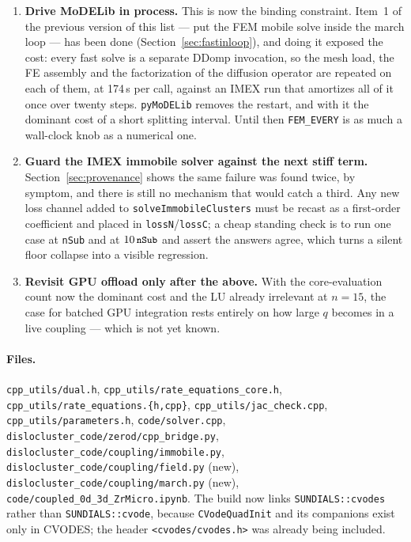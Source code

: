 \documentclass[11pt,a4paper]{article}
\newcommand{\code}[1]{\texttt{\small #1}}
\begin{document}
\begin{enumerate}
\item \textbf{Drive MoDELib in process.} This is now the binding constraint.
      Item~1 of the previous version of this list --- put the FEM mobile solve
      inside the march loop --- has been done (Section~\ref{sec:fastinloop}),
      and doing it exposed the cost: every fast solve is a separate DDomp
      invocation, so the mesh load, the FE assembly and the factorization of the
      diffusion operator are repeated on each of them, at 174\,s per call,
      against an IMEX run that amortizes all of it once over twenty steps.
      \code{pyMoDELib} removes the restart, and with it the dominant cost of a
      short splitting interval. Until then \code{FEM\_EVERY} is as much a
      wall-clock knob as a numerical one.
\item \textbf{Guard the IMEX immobile solver against the next stiff term.}
      Section~\ref{sec:provenance} shows the same failure was found twice, by
      symptom, and there is still no mechanism that would catch a third. Any new
      loss channel added to \code{solveImmobileClusters} must be recast as a
      first-order coefficient and placed in \code{lossN}/\code{lossC}; a cheap
      standing check is to run one case at \code{nSub} and at $10\,\code{nSub}$
      and assert the answers agree, which turns a silent floor collapse into a
      visible regression.
\item \textbf{Revisit GPU offload only after the above.} With the core-evaluation
      count now the dominant cost and the LU already irrelevant at $n=15$, the
      case for batched GPU integration rests entirely on how large $q$ becomes
      in a live coupling --- which is not yet known.
\end{enumerate}

\paragraph{Files.}
\code{cpp\_utils/dual.h},
\code{cpp\_utils/rate\_equations\_core.h},
\code{cpp\_utils/rate\_equations.\{h,cpp\}},
\code{cpp\_utils/jac\_check.cpp},
\code{cpp\_utils/parameters.h},
\code{code/solver.cpp},
\code{dislocluster\_code/zerod/cpp\_bridge.py},
\code{dislocluster\_code/coupling/immobile.py},
\code{dislocluster\_code/coupling/field.py} (new),
\code{dislocluster\_code/coupling/march.py} (new),
\code{code/coupled\_0d\_3d\_ZrMicro.ipynb}.
The build now links \code{SUNDIALS::cvodes} rather than \code{SUNDIALS::cvode},
because \code{CVodeQuadInit} and its companions exist only in CVODES; the
header \code{<cvodes/cvodes.h>} was already being included.
\end{document}
